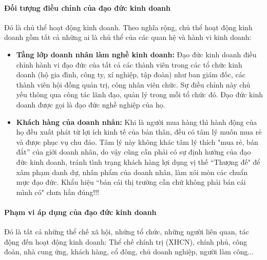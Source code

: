 \documentclass{article}
\begin{document}
        \paragraph{Đối tượng điều chỉnh của đạo đức kinh doanh}
            \vspace{0.2cm}
            Đó là chủ thể hoạt động kinh doanh. Theo nghĩa rộng, chủ thể hoạt động kinh doanh gồm tất cả những ai là chủ thể của các quan hệ và hành vi kinh doanh:
            \begin{itemize}
                \item \textbf{Tầng lớp doanh nhân làm nghề kinh doanh:} Đạo đức kinh doanh điều chỉnh hành vi đạo đức của tất cả các thành viên trong các tổ chức kinh doanh (hộ gia đình, công ty, xí nghiệp, tập đoàn) như ban giám đốc, các thành viên hội đồng quản trị, công nhân viên chức. Sự điều chỉnh này chủ yếu thông qua công tác lãnh đạo, quản lý trong mỗi tổ chức đó. Đạo đức kinh doanh được gọi là đạo đức nghề nghiệp của họ.
                \item \textbf{Khách hàng của doanh nhân:} Khi là người mua hàng thì hành động của họ đều xuất phát từ lợi ích kinh tế của bản thân, đều có tâm lý muốn mua rẻ và được phục vụ chu đáo. Tâm lý này không khác tâm lý thích "mua rẻ, bán đắt” của giới doanh nhân, do vậy cũng cần phải có sự định hướng của đạo đức kinh doanh, tránh tình trạng khách hàng lợi dụng vị thế “Thượng đế" để xâm phạm danh dự, nhân phẩm của doanh nhân, làm xói mòn các chuẩn mực đạo đức. Khẩu hiệu “bán cái thị trường cần chứ không phải bán cái mình có" chưa hẳn đúng!!!
            \end{itemize}
        \paragraph{Phạm vi áp dụng của đạo đức kinh doanh}
            \vspace{0.2cm}
            Đó là tất cả những thể chế xã hội, những tổ chức, những người liên quan, tác động đến hoạt động kinh doanh: Thể chế chính trị (XHCN), chính phủ, công đoàn, nhà cung ứng, khách hàng, cổ đông, chủ doanh nghiệp, người làm công...
    
\end{document}
